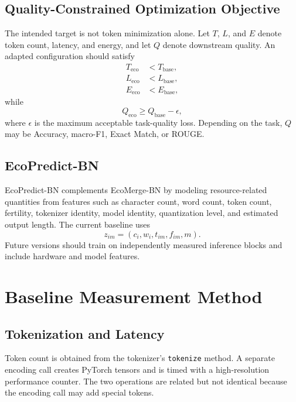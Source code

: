 \documentclass[conference]{IEEEtran}
\begin{document}
\subsection{Quality-Constrained Optimization Objective}
The intended target is not token minimization alone. Let $T$, $L$, and $E$ denote token count, latency, and energy, and let $Q$ denote downstream quality. An adapted configuration should satisfy
\begin{align}
T_{\mathrm{eco}}&<T_{\mathrm{base}},\\
L_{\mathrm{eco}}&<L_{\mathrm{base}},\\
E_{\mathrm{eco}}&<E_{\mathrm{base}},
\end{align}
while
\begin{equation}
Q_{\mathrm{eco}}\geq Q_{\mathrm{base}}-\epsilon,
\label{eq:quality}
\end{equation}
where $\epsilon$ is the maximum acceptable task-quality loss. Depending on the task, $Q$ may be Accuracy, macro-F1, Exact Match, or ROUGE.

\subsection{EcoPredict-BN}
EcoPredict-BN complements EcoMerge-BN by modeling resource-related quantities from features such as character count, word count, token count, fertility, tokenizer identity, model identity, quantization level, and estimated output length. The current baseline uses
\begin{equation}
z_{im}=(c_i,w_i,t_{im},f_{im},m).
\end{equation}
Future versions should train on independently measured inference blocks and include hardware and model features.

\section{Baseline Measurement Method}
\subsection{Tokenization and Latency}
Token count is obtained from the tokenizer's \texttt{tokenize} method. A separate encoding call creates PyTorch tensors and is timed with a high-resolution performance counter. The two operations are related but not identical because the encoding call may add special tokens.
\end{document}
